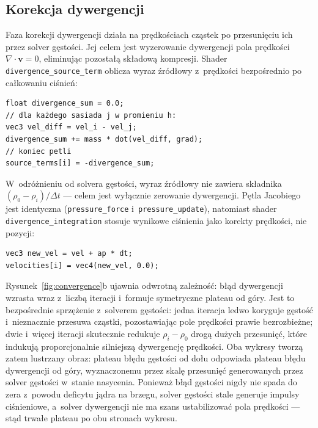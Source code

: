 \subsection{Korekcja dywergencji}
\label{subsec:divergence_correction}

Faza korekcji dywergencji działa na prędkościach cząstek po przesunięciu ich przez solver gęstości.
Jej celem jest wyzerowanie dywergencji pola prędkości $\nabla \cdot \mathbf{v} = 0$, eliminując pozostałą składową kompresji.
Shader \texttt{divergence\_source\_term} oblicza wyraz źródłowy z~prędkości bezpośrednio po całkowaniu ciśnień:

\begin{lstlisting}[caption={Shader \texttt{divergence\_source\_term} --- wyraz źródłowy solvera dywergencji},
                   label=lst:divergence_source,]
float divergence_sum = 0.0;
// dla każdego sasiada j w promieniu h:
vec3 vel_diff = vel_i - vel_j;
divergence_sum += mass * dot(vel_diff, grad);
// koniec petli
source_terms[i] = -divergence_sum;
\end{lstlisting}

W~odróżnieniu od solvera gęstości, wyraz źródłowy nie zawiera składnika $(\rho_0 - \rho_i)/\Delta t$ --- celem jest wyłącznie zerowanie dywergencji.
Pętla Jacobiego jest identyczna (\texttt{pressure\_force} i~\texttt{pressure\_update}), natomiast shader \texttt{divergence\_integration} stosuje wynikowe ciśnienia jako korekty prędkości, nie pozycji:

\begin{lstlisting}[caption={Shader \texttt{divergence\_integration} --- całkowanie prędkości},
                   label=lst:divergence_integration,]
vec3 new_vel = vel + ap * dt;
velocities[i] = vec4(new_vel, 0.0);
\end{lstlisting}

Rysunek~\ref{fig:convergence}b ujawnia odwrotną zależność:
błąd dywergencji wzrasta wraz z~liczbą iteracji i~formuje symetryczne plateau od góry.
Jest to bezpośrednie sprzężenie z~solverem gęstości: jedna iteracja ledwo koryguje gęstość
i~nieznacznie przesuwa cząstki, pozostawiając pole prędkości prawie bezrozbieżne;
dwie i~więcej iteracji skutecznie redukuje $\rho_i - \rho_0$ drogą dużych przesunięć,
które indukują proporcjonalnie silniejszą dywergencję prędkości.
Oba wykresy tworzą zatem lustrzany obraz: plateau błędu gęstości od dołu
odpowiada plateau błędu dywergencji od góry, wyznaczonemu przez skalę przesunięć
generowanych przez solver gęstości w~stanie nasycenia.
Ponieważ błąd gęstości nigdy nie spada do zera z~powodu deficytu jądra na brzegu,
solver gęstości stale generuje impulsy ciśnieniowe, a~solver dywergencji nie ma szans
ustabilizować pola prędkości --- stąd trwałe plateau po obu stronach wykresu.


